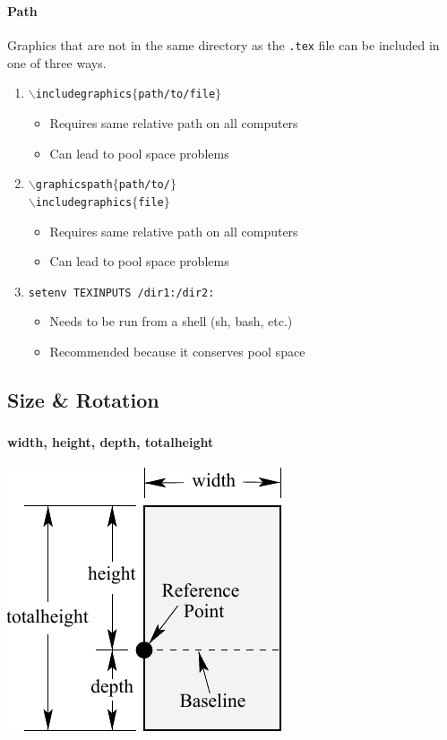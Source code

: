 \documentclass[article]{beamer}
\begin{document}
\begin{frame}
  \frametitle{\thesubsection}
  \framesubtitle{Path}
  Graphics that are not in the same directory as the \texttt{.tex} file can be included in one of three ways.
  \begin{enumerate}
    \item \texttt{$\backslash$includegraphics$\{$path/to/file$\}$}
      \begin{itemize}%
        \item Requires same relative path on all computers
        \item Can lead to pool space problems
      \end{itemize}
    \item \texttt{$\backslash$graphicspath$\{$path/to/$\}$}\\
          \texttt{$\backslash$includegraphics$\{$file$\}$}
          \begin{itemize}%
            \item Requires same relative path on all computers
            \item Can lead to pool space problems
          \end{itemize}
    \item \texttt{setenv TEXINPUTS /dir1:/dir2:}
      \begin{itemize}%
        \item Needs to be run from a shell (sh, bash, etc.)
        \item Recommended because it conserves pool space
      \end{itemize}
  \end{enumerate}
\end{frame}

\subsection{Size \& Rotation}
\begin{frame}
  \frametitle{\thesubsection}
  \framesubtitle{width, height, depth, totalheight}
  \vspace{18pt}
  \begin{center}
  \includegraphics[height=0.75\textheight]{Sizes}
  \end{center}
\end{frame}
\end{document}
